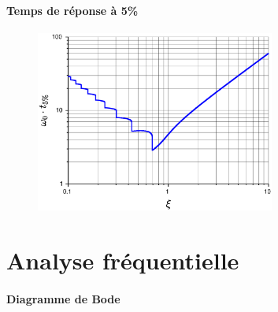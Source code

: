 \paragraph{Temps de réponse à 5\%}
\begin{figure}[!hb]
    \centering
    \includegraphics[width=0.7\textwidth]{fig/fig_temps_de_reduit.eps}
\end{figure}

{\tikzset{external/export=false}

}
\section{Analyse fréquentielle}

\paragraph{Diagramme de Bode}

\begin{figure}[!h]
\centering
{}

\end{figure}

